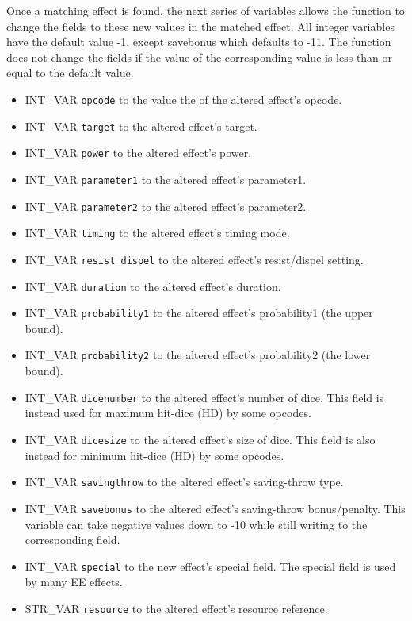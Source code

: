 \documentclass{article}
\begin{document}
Once a matching effect is found, the next series of variables allows
the function to change the fields to these new values in the matched
effect. All integer variables have the default value -1, except
savebonus which defaults to -11. The function does not change the
fields if the value of the corresponding value is less than or equal
to the default value.

\begin{itemize}
\item INT_VAR \verb+opcode+ to the value the of the altered effect's opcode.
\item INT_VAR \verb+target+ to the altered effect's target.
\item INT_VAR \verb+power+ to the altered effect's power.
\item INT_VAR \verb+parameter1+ to the altered effect's parameter1.
\item INT_VAR \verb+parameter2+ to the altered effect's parameter2.
\item INT_VAR \verb+timing+ to the altered effect's timing mode.
\item INT_VAR \verb+resist_dispel+ to the altered effect's resist/dispel setting.
\item INT_VAR \verb+duration+ to the altered effect's duration.
\item INT_VAR \verb+probability1+ to the altered effect's probability1 (the upper bound).
\item INT_VAR \verb+probability2+ to the altered effect's probability2 (the lower bound).
\item INT_VAR \verb+dicenumber+ to the altered effect's number of dice. This field is instead used for maximum hit-dice (HD) by some opcodes.
\item INT_VAR \verb+dicesize+ to the altered effect's size of dice. This field is also instead for minimum hit-dice (HD) by some opcodes.
\item INT_VAR \verb+savingthrow+ to the altered effect's saving-throw type.
\item INT_VAR \verb+savebonus+ to the altered effect's saving-throw bonus/penalty. This variable can take negative values down to -10 while still writing to the corresponding field.
\item INT_VAR \verb+special+ to the new effect's special field. The special field is used by many EE effects.
\item STR_VAR \verb+resource+ to the altered effect's resource reference.
\end{itemize}
\\
\end{document}
